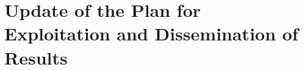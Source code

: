 
\clearpage
\section{Update of the Plan for Exploitation and Dissemination of Results}
\label{sec:exploitation-dissemination}